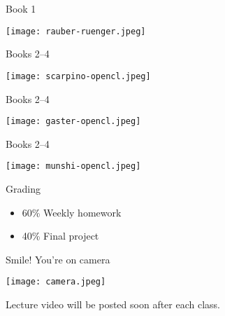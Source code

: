 \documentclass[english,compress]{beamer}
\begin{document}
\begin{frame}{Book 1}
  \begin{center}
    \texttt{[image: rauber-ruenger.jpeg]}
  \end{center}
\end{frame}
\begin{frame}{Books 2--4}
  \begin{center}
    \texttt{[image: scarpino-opencl.jpeg]}
  \end{center}
\end{frame}
\begin{frame}{Books 2--4}
  \begin{center}
    \texttt{[image: gaster-opencl.jpeg]}
  \end{center}
\end{frame}
\begin{frame}{Books 2--4}
  \begin{center}
    \texttt{[image: munshi-opencl.jpeg]}
  \end{center}
\end{frame}
\begin{frame}{Grading}
  \Large
  \begin{itemize}
    \item 60\% Weekly homework
    \item 40\% Final project
  \end{itemize}
\end{frame}
\begin{frame}{Smile! You're on camera}
  \begin{center}
    \texttt{[image: camera.jpeg]}

    Lecture video will be posted soon after each class.
  \end{center}
\end{frame}
\end{document}
